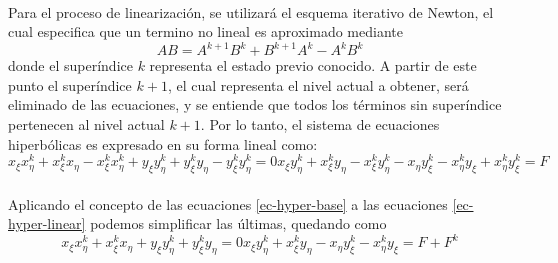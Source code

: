 \documentclass[letterpaper, openright, 12pt]{book}
\begin{document}
		\paragraph*{}
			Para el proceso de linearización, se utilizará el esquema iterativo de Newton, el cual especifica que un termino no lineal es aproximado mediante
			\begin{equation}
				AB = A^{k + 1} B^{k} + B^{k + 1} A^{k} - A^{k} B^{k}
			\end{equation}
			donde el superíndice $k$ representa el estado previo conocido. A partir de este punto el superíndice $k + 1$, el cual representa el nivel actual a obtener, será eliminado de las ecuaciones, y se entiende que todos los términos sin superíndice pertenecen al nivel actual $k + 1$. Por lo tanto, el sistema de ecuaciones hiperbólicas es expresado en su forma lineal como:
			\begin{subequations}
				\begin{equation}
					x_{\xi} x_{\eta}^{k} + x_{\xi}^{k} x_{\eta} - x_{\xi}^{k} x_{\eta}^{k} + y_{\xi} y_{\eta}^{k} + y_{\xi}^{k} y_{\eta} - y_{\xi}^{k} y_{\eta}^{k} = 0
				\end{equation}
				\begin{equation}
					x_{\xi} y_{\eta}^{k} + x_{\xi}^{k} y_{\eta} - x_{\xi}^{k} y_{\eta}^{k} - x_{\eta} y_{\xi}^{k} - x_{\eta}^{k} y_{\xi} + x_{\eta}^{k} y_{\xi}^{k} = F
				\end{equation}
				\label{ec-hyper-linear}
			\end{subequations}
		
		\paragraph*{}
			Aplicando el concepto de las ecuaciones \ref{ec-hyper-base} a las ecuaciones \ref{ec-hyper-linear} podemos simplificar las últimas, quedando como
			\begin{subequations}
				\begin{equation}
					x_{\xi} x_{\eta}^{k} + x_{\xi}^{k} x_{\eta} + y_{\xi} y_{\eta}^{k} + y_{\xi}^{k} y_{\eta} = 0
				\end{equation}
				\begin{equation}
					x_{\xi} y_{\eta}^{k} + x_{\xi}^{k} y_{\eta} - x_{\eta} y_{\xi}^{k} - x_{\eta}^{k} y_{\xi} = F + F^{k}
				\end{equation}
				\label{ec-hyper-reducida}
			\end{subequations}
		
\end{document}
